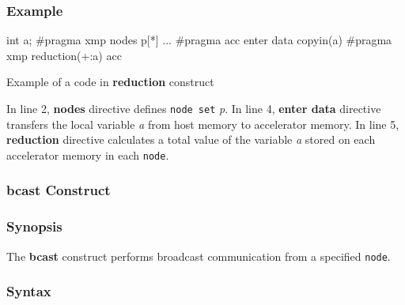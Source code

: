 \subsubsection*{Example}
\begin{myfigure}
\begin{minipage}{0.45\hsize}
\begin{center}
\end{center}
\end{minipage}
%
\begin{minipage}{0.53\hsize}
\begin{center}
\begin{XACCCexampleR}
int a;
#pragma xmp nodes p[*]
...
#pragma acc enter data copyin(a)
#pragma xmp reduction(+:a) acc
\end{XACCCexampleR}
\end{center}
\end{minipage}
\caption{Example of a code in {\XACC} {\bf reduction} construct}\label{code:reduction}
\end{myfigure}

In line 2,
{\XMP} {\bf nodes} directive defines {\tt node set} {\it p}.
In line 4,
{\OACC} {\bf enter data} directive transfers the local variable {\it a} from host memory to accelerator memory.
In line 5,
{\XACC} {\bf reduction} directive calculates a total value of the variable {\it a} stored on each accelerator
memory in each {\tt node}.

\subsubsection{bcast Construct}\label{sec:bcast}
\subsubsection*{Synopsis}
The {\bf bcast} construct performs broadcast communication from a specified {\tt node}.

\subsubsection*{Syntax}

